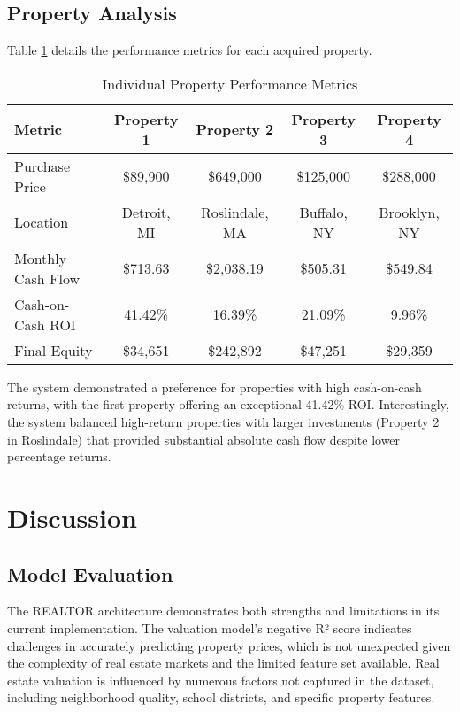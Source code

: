 \documentclass[conference]{IEEEtran}
\begin{document}
\subsection{Property Analysis}
Table \ref{tab:property_performance} details the performance metrics for each acquired property.

\begin{table}[htbp]
\caption{Individual Property Performance Metrics}
\begin{center}
\begin{tabular}{lcccc}
\hline
\textbf{Metric} & \textbf{Property 1} & \textbf{Property 2} & \textbf{Property 3} & \textbf{Property 4} \\
\hline
Purchase Price & \$89,900 & \$649,000 & \$125,000 & \$288,000 \\
Location & Detroit, MI & Roslindale, MA & Buffalo, NY & Brooklyn, NY \\
Monthly Cash Flow & \$713.63 & \$2,038.19 & \$505.31 & \$549.84 \\
Cash-on-Cash ROI & 41.42\% & 16.39\% & 21.09\% & 9.96\% \\
Final Equity & \$34,651 & \$242,892 & \$47,251 & \$29,359 \\
\hline
\end{tabular}
\label{tab:property_performance}
\end{center}
\end{table}

The system demonstrated a preference for properties with high cash-on-cash returns, with the first property offering an exceptional 41.42\% ROI. Interestingly, the system balanced high-return properties with larger investments (Property 2 in Roslindale) that provided substantial absolute cash flow despite lower percentage returns.

\section{Discussion}

\subsection{Model Evaluation}
The REALTOR architecture demonstrates both strengths and limitations in its current implementation. The valuation model's negative R² score indicates challenges in accurately predicting property prices, which is not unexpected given the complexity of real estate markets and the limited feature set available. Real estate valuation is influenced by numerous factors not captured in the dataset, including neighborhood quality, school districts, and specific property features.
\end{document}
